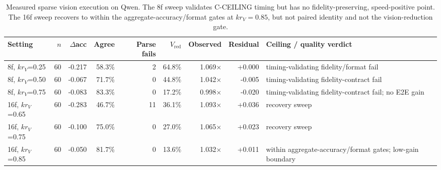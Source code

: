 \begin{table}[H]
\centering
\caption{Measured sparse vision execution on Qwen. The 8f sweep validates C-CEILING timing but has no fidelity-preserving, speed-positive point. The 16f sweep recovers to within the aggregate-accuracy/format gates at \(kr_V=0.85\), but not paired identity and not the vision-reduction gate.}
\label{tab:qwen-measured-sparse-vision}
\scriptsize
\renewcommand{\arraystretch}{\PaperTableStretch}
\begin{tabularx}{\linewidth}{@{}l r r r r r r r Y@{}}
\toprule
Setting & \(n\) & \(\Delta\)acc & Agree & Parse fails & \(V_{\mathrm{red}}\) & Observed & Residual & Ceiling / quality verdict \\
\midrule
8f, $kr_V$=0.25 & 60 & -0.217 & 58.3\% & 2 & 64.8\% & 1.069$\times$ & +0.000 & timing-validating fidelity/format fail \\
8f, $kr_V$=0.50 & 60 & -0.067 & 71.7\% & 0 & 44.8\% & 1.042$\times$ & -0.005 & timing-validating fidelity-contract fail \\
8f, $kr_V$=0.75 & 60 & -0.083 & 83.3\% & 0 & 17.2\% & 0.998$\times$ & -0.020 & timing-validating fidelity-contract fail; no E2E gain \\
16f, $kr_V$=0.65 & 60 & -0.283 & 46.7\% & 11 & 36.1\% & 1.093$\times$ & +0.036 & recovery sweep \\
16f, $kr_V$=0.75 & 60 & -0.100 & 75.0\% & 0 & 27.0\% & 1.065$\times$ & +0.023 & recovery sweep \\
16f, $kr_V$=0.85 & 60 & -0.050 & 81.7\% & 0 & 13.6\% & 1.032$\times$ & +0.011 & within aggregate-accuracy/format gates; low-gain boundary \\
\bottomrule
\end{tabularx}
\end{table}
